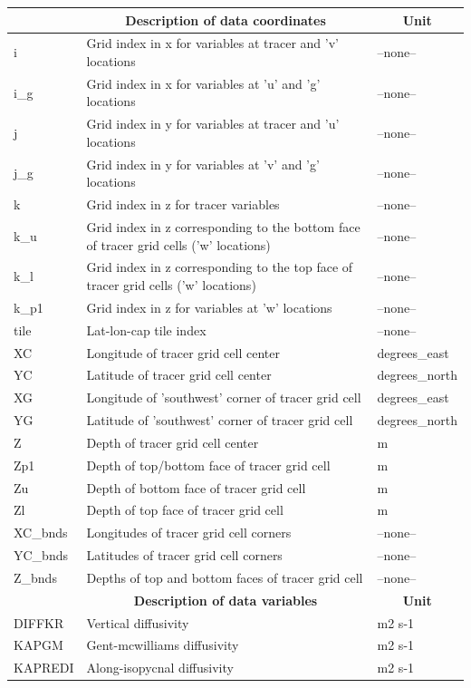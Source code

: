 \begin{longtable}{|m{}|m{}|m{}|}
\hline \endhead \hline \endfoot
\rowcolor{lightgray} \multicolumn{1}{|c|}{\textbf{Coordinates}} & \multicolumn{1}{|c|}{\textbf{Description of data coordinates}} &  \multicolumn{1}{|c|}{\textbf{Unit}}\\ \hline
i &Grid index in x for variables at tracer and 'v' locations &--none--  \\ \hline
i\_g &Grid index in x for variables at 'u' and 'g' locations &--none--  \\ \hline
j &Grid index in y for variables at tracer and 'u' locations &--none--  \\ \hline
j\_g &Grid index in y for variables at 'v' and 'g' locations &--none--  \\ \hline
k &Grid index in z for tracer variables &--none--  \\ \hline
k\_u &Grid index in z corresponding to the bottom face of tracer grid cells ('w' locations) &--none--  \\ \hline
k\_l &Grid index in z corresponding to the top face of tracer grid cells ('w' locations) &--none--  \\ \hline
k\_p1 &Grid index in z for variables at 'w' locations &--none--  \\ \hline
tile &Lat-lon-cap tile index &--none--  \\ \hline
XC &Longitude of tracer grid cell center &degrees\_east  \\ \hline
YC &Latitude of tracer grid cell center &degrees\_north  \\ \hline
XG &Longitude of 'southwest' corner of tracer grid cell &degrees\_east  \\ \hline
YG &Latitude of 'southwest' corner of tracer grid cell &degrees\_north  \\ \hline
Z &Depth of tracer grid cell center &m  \\ \hline
Zp1 &Depth of top/bottom face of tracer grid cell &m  \\ \hline
Zu &Depth of bottom face of tracer grid cell &m  \\ \hline
Zl &Depth of top face of tracer grid cell &m  \\ \hline
XC\_bnds &Longitudes of tracer grid cell corners &--none--  \\ \hline
YC\_bnds &Latitudes of tracer grid cell corners &--none--  \\ \hline
Z\_bnds &Depths of top and bottom faces of tracer grid cell &--none--  \\ \hline
\rowcolor{lightgray} \multicolumn{1}{|c|}{\textbf{Variables}} & \multicolumn{1}{|c|}{\textbf{Description of data variables}} &  \multicolumn{1}{|c|}{\textbf{Unit}}\\ \hline
DIFFKR &Vertical diffusivity &m2 s-1  \\ \hline
KAPGM &Gent-mcwilliams diffusivity &m2 s-1  \\ \hline
KAPREDI &Along-isopycnal diffusivity &m2 s-1  \\ \hline
\end{longtable}


